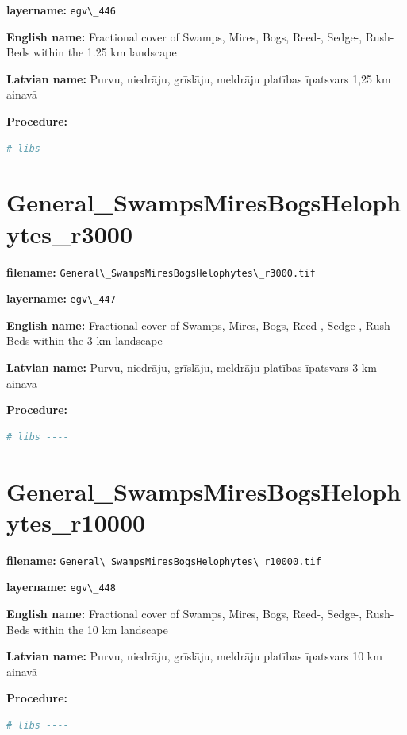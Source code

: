 \documentclass[
]{book}
\newcommand{\passthrough}[1]{#1}
\begin{document}
\textbf{layername:} \passthrough{\lstinline!egv\_446!}

\textbf{English name:} Fractional cover of Swamps, Mires, Bogs, Reed-, Sedge-, Rush- Beds within the 1.25 km landscape

\textbf{Latvian name:} Purvu, niedrāju, grīslāju, meldrāju platības īpatsvars 1,25 km ainavā

\textbf{Procedure:}

\begin{lstlisting}[language=R]
# libs ----
\end{lstlisting}

\section{General\_SwampsMiresBogsHelophytes\_r3000}\label{ch06.447}

\textbf{filename:} \passthrough{\lstinline!General\_SwampsMiresBogsHelophytes\_r3000.tif!}

\textbf{layername:} \passthrough{\lstinline!egv\_447!}

\textbf{English name:} Fractional cover of Swamps, Mires, Bogs, Reed-, Sedge-, Rush- Beds within the 3 km landscape

\textbf{Latvian name:} Purvu, niedrāju, grīslāju, meldrāju platības īpatsvars 3 km ainavā

\textbf{Procedure:}

\begin{lstlisting}[language=R]
# libs ----
\end{lstlisting}

\section{General\_SwampsMiresBogsHelophytes\_r10000}\label{ch06.448}

\textbf{filename:} \passthrough{\lstinline!General\_SwampsMiresBogsHelophytes\_r10000.tif!}

\textbf{layername:} \passthrough{\lstinline!egv\_448!}

\textbf{English name:} Fractional cover of Swamps, Mires, Bogs, Reed-, Sedge-, Rush- Beds within the 10 km landscape

\textbf{Latvian name:} Purvu, niedrāju, grīslāju, meldrāju platības īpatsvars 10 km ainavā

\textbf{Procedure:}

\begin{lstlisting}[language=R]
# libs ----
\end{lstlisting}
\end{document}
